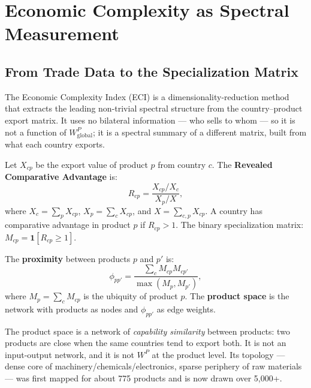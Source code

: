 \documentclass[../structural_economics_book.tex]{subfiles}
\begin{document}
\section{Economic Complexity as Spectral Measurement}
\label{ch16:sec:ECI}

\subsection{From Trade Data to the Specialization Matrix}

The Economic Complexity Index (ECI) is a dimensionality-reduction method that extracts the leading non-trivial spectral structure from the country--product export matrix. It uses no bilateral information --- who sells to whom --- so it is not a function of $W^P_{\text{global}}$; it is a spectral summary of a different matrix, built from what each country exports.

\begin{definition}\label{ch16:def:RCA}
Let $X_{cp}$ be the export value of product $p$ from country $c$. The \textbf{Revealed Comparative Advantage} is:
\begin{equation}\label{ch16:eq:RCA}
R_{cp} = \frac{X_{cp}/X_c}{X_p/X},
\end{equation}
where $X_c = \sum_p X_{cp}$, $X_p = \sum_c X_{cp}$, and $X = \sum_{c,p} X_{cp}$. A country has comparative advantage in product $p$ if $R_{cp} > 1$. The binary specialization matrix: $M_{cp} = \mathbf{1}[R_{cp} \geq 1]$.
\end{definition}

\begin{definition}\label{ch16:def:proximity}
The \textbf{proximity} between products $p$ and $p'$ is:
\begin{equation}\label{ch16:eq:proximity}
\phi_{pp'} = \frac{\sum_c M_{cp}M_{cp'}}{\max(M_p, M_{p'})},
\end{equation}
where $M_p = \sum_c M_{cp}$ is the ubiquity of product $p$. The \textbf{product space} is the network with products as nodes and $\phi_{pp'}$ as edge weights.
\end{definition}

The product space is a network of \emph{capability similarity} between products: two products are close when the same countries tend to export both. It is not an input-output network, and it is not $W^P$ at the product level. Its topology --- dense core of machinery/chemicals/electronics, sparse periphery of raw materials --- was first mapped for about 775 products \citep{hidalgo2007product} and is now drawn over 5,000+.
\end{document}
